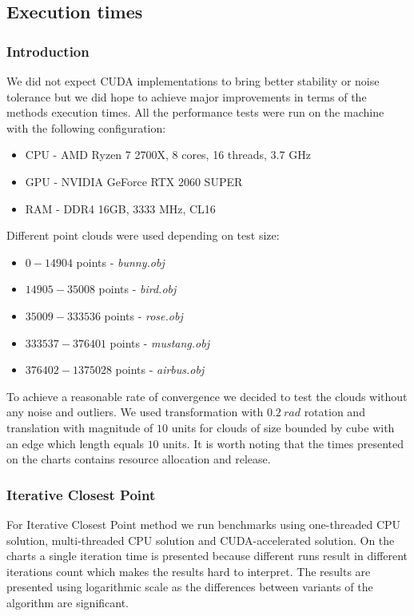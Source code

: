 \documentclass[titlepage]{article}
\begin{document}
\subsection{Execution times}
\subsubsection{Introduction}
We did not expect CUDA implementations to bring better stability or noise tolerance but we did hope to achieve major improvements in terms of the methods execution times. All the performance tests were run on the machine with the following configuration:
\begin{itemize}
\item CPU - AMD Ryzen 7 2700X, 8 cores, 16 threads, 3.7 GHz
\item GPU - NVIDIA GeForce RTX 2060 SUPER
\item RAM - DDR4 16GB, 3333 MHz, CL16
\end{itemize}

Different point clouds were used depending on test size:
\begin{itemize}
\item $0 - 14904$ points - \textit{bunny.obj}
\item $14905 - 35008$ points - \textit{bird.obj}
\item $35009 - 333536$ points - \textit{rose.obj}
\item $333537 - 376401$ points - \textit{mustang.obj}
\item $376402 - 1375028$ points - \textit{airbus.obj}
\end{itemize}

To achieve a reasonable rate of convergence we decided to test the clouds without any noise and outliers. We used transformation with $0.2\: rad$ rotation and translation with magnitude of $10$ units for clouds of size bounded by cube with an edge which length equals $10$ units. It is worth noting that the times presented on the charts contains resource allocation and release.

\subsubsection{Iterative Closest Point}
For Iterative Closest Point method we run benchmarks using one-threaded CPU solution, multi-threaded CPU solution and CUDA-accelerated solution. On the charts a single iteration time is presented because different runs result in different iterations count which makes the results hard to interpret. The results are presented using logarithmic scale as the differences between variants of the algorithm are significant.
\end{document}

